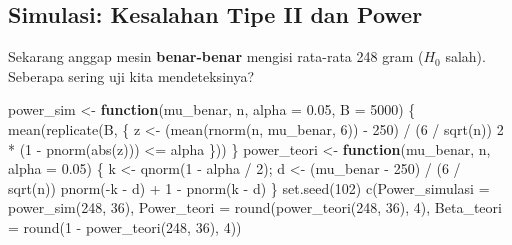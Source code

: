 \documentclass[
  indonesian,
  letterpaper,
]{book}
\newenvironment{Shaded}{\begin{snugshade}}{\end{snugshade}}
\newcommand{\AttributeTok}[1]{\textcolor[rgb]{0.40,0.45,0.13}{#1}}
\newcommand{\ControlFlowTok}[1]{\textcolor[rgb]{0.00,0.23,0.31}{\textbf{#1}}}
\newcommand{\DecValTok}[1]{\textcolor[rgb]{0.68,0.00,0.00}{#1}}
\newcommand{\FloatTok}[1]{\textcolor[rgb]{0.68,0.00,0.00}{#1}}
\newcommand{\FunctionTok}[1]{\textcolor[rgb]{0.28,0.35,0.67}{#1}}
\newcommand{\NormalTok}[1]{\textcolor[rgb]{0.00,0.23,0.31}{#1}}
\newcommand{\OtherTok}[1]{\textcolor[rgb]{0.00,0.23,0.31}{#1}}
\newcommand{\SpecialCharTok}[1]{\textcolor[rgb]{0.37,0.37,0.37}{#1}}
\begin{document}
\subsection{Simulasi: Kesalahan Tipe II dan
Power}\label{simulasi-kesalahan-tipe-ii-dan-power}

Sekarang anggap mesin \textbf{benar-benar} mengisi rata-rata 248 gram
(\(H_0\) salah). Seberapa sering uji kita mendeteksinya?

\begin{Shaded}
\begin{Highlighting}[]
\NormalTok{power\_sim }\OtherTok{\textless{}{-}} \ControlFlowTok{function}\NormalTok{(mu\_benar, n, }\AttributeTok{alpha =} \FloatTok{0.05}\NormalTok{, }\AttributeTok{B =} \DecValTok{5000}\NormalTok{) \{}
  \FunctionTok{mean}\NormalTok{(}\FunctionTok{replicate}\NormalTok{(B, \{}
\NormalTok{    z }\OtherTok{\textless{}{-}}\NormalTok{ (}\FunctionTok{mean}\NormalTok{(}\FunctionTok{rnorm}\NormalTok{(n, mu\_benar, }\DecValTok{6}\NormalTok{)) }\SpecialCharTok{{-}} \DecValTok{250}\NormalTok{) }\SpecialCharTok{/}\NormalTok{ (}\DecValTok{6} \SpecialCharTok{/} \FunctionTok{sqrt}\NormalTok{(n))}
    \DecValTok{2} \SpecialCharTok{*}\NormalTok{ (}\DecValTok{1} \SpecialCharTok{{-}} \FunctionTok{pnorm}\NormalTok{(}\FunctionTok{abs}\NormalTok{(z))) }\SpecialCharTok{\textless{}=}\NormalTok{ alpha}
\NormalTok{  \}))}
\NormalTok{\}}
\NormalTok{power\_teori }\OtherTok{\textless{}{-}} \ControlFlowTok{function}\NormalTok{(mu\_benar, n, }\AttributeTok{alpha =} \FloatTok{0.05}\NormalTok{) \{}
\NormalTok{  k }\OtherTok{\textless{}{-}} \FunctionTok{qnorm}\NormalTok{(}\DecValTok{1} \SpecialCharTok{{-}}\NormalTok{ alpha }\SpecialCharTok{/} \DecValTok{2}\NormalTok{); d }\OtherTok{\textless{}{-}}\NormalTok{ (mu\_benar }\SpecialCharTok{{-}} \DecValTok{250}\NormalTok{) }\SpecialCharTok{/}\NormalTok{ (}\DecValTok{6} \SpecialCharTok{/} \FunctionTok{sqrt}\NormalTok{(n))}
  \FunctionTok{pnorm}\NormalTok{(}\SpecialCharTok{{-}}\NormalTok{k }\SpecialCharTok{{-}}\NormalTok{ d) }\SpecialCharTok{+} \DecValTok{1} \SpecialCharTok{{-}} \FunctionTok{pnorm}\NormalTok{(k }\SpecialCharTok{{-}}\NormalTok{ d)}
\NormalTok{\}}
\FunctionTok{set.seed}\NormalTok{(}\DecValTok{102}\NormalTok{)}
\FunctionTok{c}\NormalTok{(}\AttributeTok{Power\_simulasi =} \FunctionTok{power\_sim}\NormalTok{(}\DecValTok{248}\NormalTok{, }\DecValTok{36}\NormalTok{), }\AttributeTok{Power\_teori =} \FunctionTok{round}\NormalTok{(}\FunctionTok{power\_teori}\NormalTok{(}\DecValTok{248}\NormalTok{, }\DecValTok{36}\NormalTok{), }\DecValTok{4}\NormalTok{),}
  \AttributeTok{Beta\_teori =} \FunctionTok{round}\NormalTok{(}\DecValTok{1} \SpecialCharTok{{-}} \FunctionTok{power\_teori}\NormalTok{(}\DecValTok{248}\NormalTok{, }\DecValTok{36}\NormalTok{), }\DecValTok{4}\NormalTok{))}
\end{Highlighting}
\end{Shaded}
\end{document}
